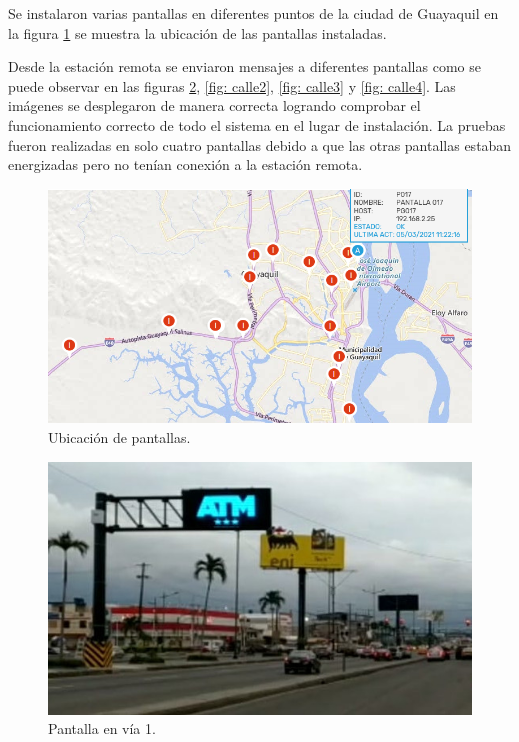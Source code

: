 Se instalaron varias pantallas en diferentes puntos de la ciudad de Guayaquil en la figura \ref{fig: mapa} se muestra la ubicación de las pantallas instaladas.

Desde la estación remota se enviaron mensajes a diferentes pantallas como se puede observar en las figuras \ref{fig: calle1}, \ref{fig: calle2}, \ref{fig: calle3} y \ref{fig: calle4}. Las imágenes se desplegaron de manera correcta logrando comprobar el funcionamiento correcto de todo el sistema en el lugar de instalación.
La pruebas fueron realizadas en solo cuatro pantallas debido a que las otras pantallas estaban energizadas pero no tenían conexión a la estación remota.


\begin{figure}[htpb]
	\centering
	\includegraphics[scale=0.6]{Figures/mapapantallas.png} 
	\caption{Ubicación de pantallas.}
	\label{fig: mapa}
\end{figure}




\begin{figure}[htpb]
	\centering
	\includegraphics[scale=3]{Figures/calle1.jpg} 
	\caption{Pantalla en vía 1.}
	\label{fig: calle1}
\end{figure}

